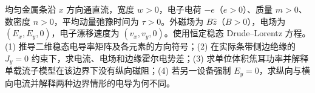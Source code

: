均匀金属条沿 \(x\) 方向通直流，宽度 \(w>0\)，电子电荷 \(-e\)（\(e>0\)）、质量 \(m>0\)、数密度 \(n>0\)，平均动量弛豫时间为 \(\tau>0\)。外磁场为 \(B\hat z\)（\(B>0\)），电场为 \((E_x,E_y,0)\)，电子漂移速度为 \((v_x,v_y,0)\)。使用恒定稳态 Drude–Lorentz 方程。
(1) 推导二维稳态电导率矩阵及各元素的方向符号；(2) 在实际条带侧边绝缘的 \(J_y=0\) 约束下，求电流、电场和边缘霍尔电势差；(3) 求单位体积焦耳功率并解释单载流子模型在该边界下没有纵向磁阻；(4) 若另一设备强制 \(E_y=0\)，求纵向与横向电流并解释两种边界情形的电导为何不同。
